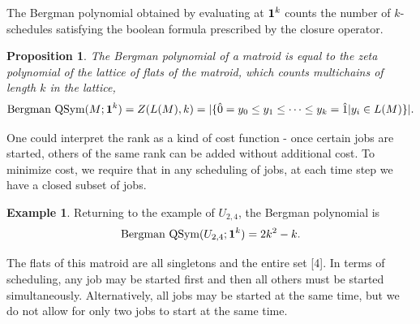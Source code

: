 \documentclass[12pt,reqno]{amsart}
\numberwithin{definition}{section}
\newtheorem{proposition}[definition]{Proposition}
\newtheorem{theorem}[definition]{Theorem}
\theoremstyle{definition}
\newtheorem{example}[definition]{Example}
\newcommand{\SSS}{\mathcal{S}}
\newcommand{\mset}[2]{ \left\{ #1 \; \middle| \; #2 \right\}}
\newcommand{\poly}{\chi} %
\begin{document}
The Bergman polynomial obtained
by evaluating at ${\bf 1}^k$ counts the number of
$k$-schedules satisfying the boolean formula prescribed by the closure
operator. 

\begin{proposition}
The Bergman polynomial of a matroid is equal to the zeta polynomial of the lattice of flats of the matroid, which counts multichains of length $k$ in the lattice,
$$\textrm{Bergman QSym}(M;{\bf 1}^k) = Z(L(M),k) = |\{ \hat{0} = y_0 \leq y_1 \leq \cdots \leq y_k = \hat{1} | y_i \in L(M) \}|.$$

\end{proposition}

 One could interpret the rank as a kind of cost function -
once certain jobs are started, others of the same rank can be added
without additional cost.  To minimize cost, we require that in any
scheduling of jobs, at each time step we have a closed subset of jobs.

\begin{example}
Returning to the example of $U_{2,4}$, the Bergman polynomial is
$$\textrm{Bergman QSym}(U_{2,4};{\bf 1}^k) = 2k^2 - k.$$

The flats of this matroid are all singletons and the entire set [4].  In terms of scheduling, any job may be started first and then all others must be started simultaneously.  Alternatively, all jobs may be started at the same time, but we do not allow for only two jobs to start at the same time. 
\end{example}







\end{document}
